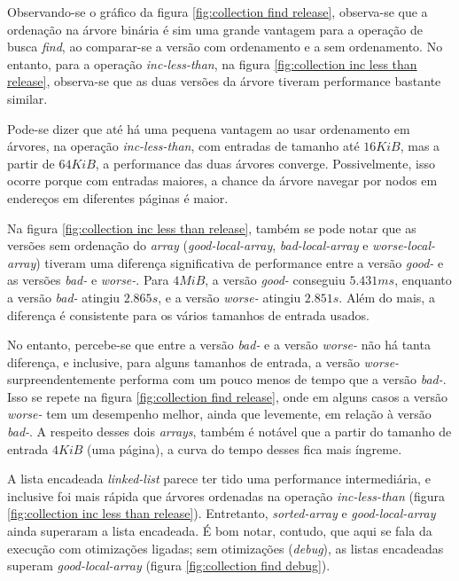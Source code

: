 \documentclass[a4paper]{article}
\begin{document}
Observando-se o gráfico da figura \ref{fig:collection find release},
observa-se que a ordenação na árvore binária é sim uma grande vantagem para
a operação de busca \textit{find}, ao comparar-se a versão com ordenamento e a
sem ordenamento. No entanto, para a operação \textit{inc-less-than}, na figura
\ref{fig:collection inc less than release}, observa-se que as duas versões da
árvore tiveram performance bastante similar.

Pode-se dizer que até há uma pequena vantagem ao usar ordenamento em árvores,
na operação \textit{inc-less-than}, com entradas de tamanho até
$16 KiB$, mas a partir de $64 KiB$, a performance das duas árvores converge.
Possivelmente, isso ocorre porque com entradas maiores, a chance da árvore
navegar por nodos em endereços em diferentes páginas é maior.

Na figura \ref{fig:collection inc less than release}, também se pode notar que
as versões sem ordenação do \textit{array} (\textit{good-local-array},
\textit{bad-local-array} e \textit{worse-local-array}) tiveram uma diferença
significativa de performance entre a versão \textit{good-} e as versões
\textit{bad-} e \textit{worse-}. Para $4MiB$, a versão \textit{good-} conseguiu
$5.431 ms$, enquanto a versão \textit{bad-} atingiu $2.865 s$, e a versão
\textit{worse-} atingiu $2.851 s$. Além do mais, a diferença é consistente para
os vários tamanhos de entrada usados.

No entanto, percebe-se que entre a versão \textit{bad-} e a versão
\textit{worse-} não há tanta diferença, e inclusive, para alguns tamanhos de
entrada, a versão \textit{worse-} surpreendentemente performa com um pouco menos
de tempo que a versão \textit{bad-}. Isso se repete na figura
\ref{fig:collection find release}, onde em alguns casos a versão
\textit{worse-} tem um desempenho melhor, ainda que levemente,
em relação à versão \textit{bad-}. A respeito desses dois \textit{arrays},
também é notável que a partir do tamanho de entrada $4KiB$ (uma página),
a curva do tempo desses fica mais íngreme.

A lista encadeada \textit{linked-list} parece ter tido uma performance
intermediária, e inclusive foi mais rápida que árvores ordenadas na operação
\textit{inc-less-than} (figura \ref{fig:collection inc less than release}).
Entretanto, \textit{sorted-array} e \textit{good-local-array} ainda superaram a
lista encadeada. É bom notar, contudo, que aqui se fala da execução com
otimizações ligadas; sem otimizações (\textit{debug}), as listas
encadeadas superam \textit{good-local-array}
(figura \ref{fig:collection find debug}).
\end{document}
